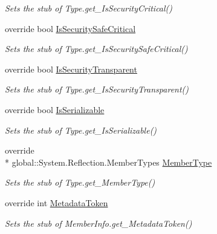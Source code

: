 \begin{DoxyCompactItemize}
\begin{DoxyCompactList}\small\item\em Sets the stub of Type.\-get\-\_\-\-Is\-Security\-Critical()\end{DoxyCompactList}\item 
override bool \hyperlink{class_system_1_1_fakes_1_1_stub_type_ac019488cc1a0786651b1136d5cfa2c0c}{Is\-Security\-Safe\-Critical}
\begin{DoxyCompactList}\small\item\em Sets the stub of Type.\-get\-\_\-\-Is\-Security\-Safe\-Critical()\end{DoxyCompactList}\item 
override bool \hyperlink{class_system_1_1_fakes_1_1_stub_type_a366b3df38fda5ec57579cab2055f525c}{Is\-Security\-Transparent}
\begin{DoxyCompactList}\small\item\em Sets the stub of Type.\-get\-\_\-\-Is\-Security\-Transparent()\end{DoxyCompactList}\item 
override bool \hyperlink{class_system_1_1_fakes_1_1_stub_type_a797e93ff16f929a0feff1944ceac0b1c}{Is\-Serializable}
\begin{DoxyCompactList}\small\item\em Sets the stub of Type.\-get\-\_\-\-Is\-Serializable()\end{DoxyCompactList}\item 
override \\*
global\-::\-System.\-Reflection.\-Member\-Types \hyperlink{class_system_1_1_fakes_1_1_stub_type_ab5d48e1f186d267e813c593a678b5ca7}{Member\-Type}
\begin{DoxyCompactList}\small\item\em Sets the stub of Type.\-get\-\_\-\-Member\-Type()\end{DoxyCompactList}\item 
override int \hyperlink{class_system_1_1_fakes_1_1_stub_type_a4303634bd00e2c477fa330e8e1af4606}{Metadata\-Token}
\begin{DoxyCompactList}\small\item\em Sets the stub of Member\-Info.\-get\-\_\-\-Metadata\-Token()\end{DoxyCompactList}\item 

\end{DoxyCompactItemize}
